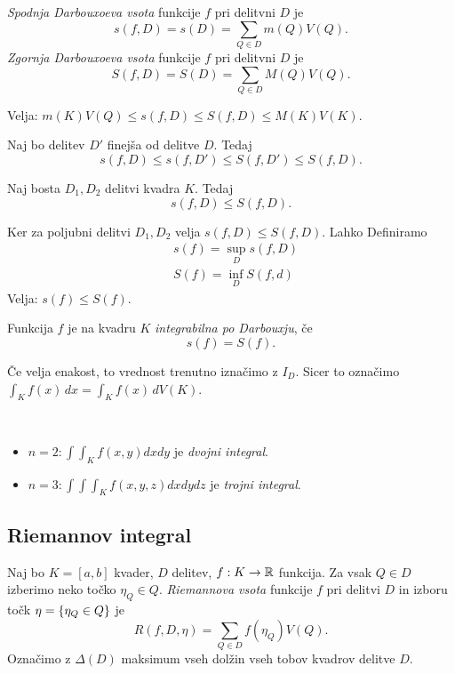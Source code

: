 \begin{definicija}
    \emph{Spodnja Darbouxoeva vsota} funkcije \(f\) pri delitvni \(D\) je 
    \[s(f, D) = s(D) = \sum_{Q \in D} m(Q) V(Q).\]
    \emph{Zgornja Darbouxoeva vsota} funkcije \(f\) pri delitvni \(D\) je 
    \[S(f, D) = S(D) = \sum_{Q \in D} M(Q) V(Q).\]
\end{definicija}
\begin{opomba}
    Velja: \(m(K)V(Q) \leq s(f, D) \leq S(f,D) \leq M(K)V(K)\).
\end{opomba}
\begin{lema}
    Naj bo delitev \(D'\) finejša od delitve \(D\). Tedaj
    \[s(f, D) \leq s(f, D') \leq S(f, D') \leq S(f, D).\]
\end{lema}
\begin{posledica}
    Naj bosta \(D_1, D_2\) delitvi kvadra \(K\). Tedaj
    \[s(f,D) \leq S(f, D).\]
\end{posledica}

Ker za poljubni delitvi \(D_1, D_2\) velja \(s(f,D) \leq S(f, D)\). Lahko Definiramo
\begin{align*}
    &s(f) = \sup_D s(f, D) \\
    &S(f) = \inf_D S(f, d)
\end{align*}
Velja: \(s(f) \leq S(f)\).
\begin{definicija}
    Funkcija \(f\) je na kvadru \(K\) \emph{integrabilna po Darbouxju}, če 
    \[s(f) = S(f).\]
\end{definicija}

\begin{opomba}
    Če velja enakost, to vrednost trenutno iznačimo z \(I_D\). Sicer to označimo \(\int_K f(x) \, dx = \int_K f(x) \, dV(K)\).
\end{opomba}

\begin{primer}
    \
    \begin{itemize}
        \item[] \(n=2: \int \int_K f(x,y) dxdy\) je \emph{dvojni integral}.
        \item[] \(n=3: \int \int \int_K f(x,y,z) dxdydz\) je \emph{trojni integral}.
    \end{itemize}
\end{primer}

\newpage
\subsection{Riemannov integral}
\begin{definicija}
    Naj bo \(K = [a,b]\) kvader, \(D\) delitev, \(f: K \to \mathbb{R}\) funkcija. Za vsak \(Q \in D\) izberimo neko točko \(\eta_Q \in Q\). \emph{Riemannova vsota} funkcije \(f\) pri delitvi \(D\) in izboru točk \(\eta = \left\{\eta_Q \in Q\right\}\) je 
    \[R(f, D, \eta) = \sum_{Q \in D} f(\eta_Q) V(Q).\]
    Označimo z \(\Delta(D)\) maksimum vseh dolžin vseh tobov kvadrov delitve \(D\).
\end{definicija}

